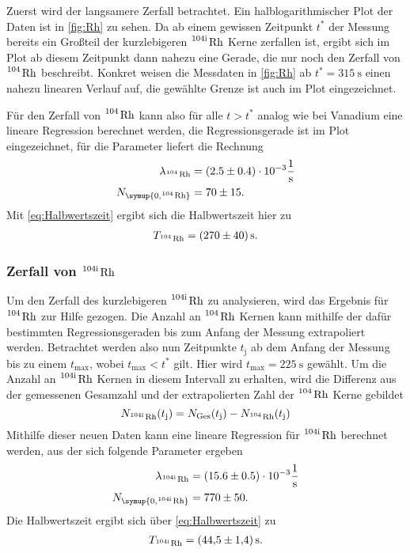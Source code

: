 Zuerst wird der langsamere Zerfall betrachtet. Ein halblogarithmischer Plot der Daten ist in \autoref{fig:Rh} zu sehen.
Da ab einem gewissen Zeitpunkt $t^*$ der Messung bereits ein
Großteil der kurzlebigeren $\ce{^{104\text{i}} Rh}$ Kerne zerfallen ist, ergibt sich im Plot ab diesem Zeitpunkt
dann nahezu eine Gerade, die nur noch den Zerfall von $\ce{^104 Rh}$ beschreibt.
Konkret weisen die Messdaten in \autoref{fig:Rh} ab $t^*=\qty{315}{\second}$ einen nahezu linearen Verlauf auf,
die gewählte Grenze ist auch im Plot eingezeichnet.

Für den Zerfall von $\ce{^104 Rh}$ kann also für alle $t>t^*$ analog wie bei Vanadium eine lineare Regression
berechnet werden, die Regressionsgerade ist im Plot eingezeichnet, für die Parameter liefert die Rechnung
\begin{align*}
  \lambda_{\ce{^104 Rh}} &= (2.5 \pm 0.4) \cdot 10^{-3} \unit{\per\second} \\
  N_{\symup{0, \ce{^104 Rh}}} &= 70 \pm 15.
\end{align*}
Mit \eqref{eq:Halbwertszeit} ergibt sich die Halbwertszeit hier zu
\begin{gather*}
  T_{\ce{^104 Rh}} = \qty{270+-40}{\second}.
\end{gather*}

\subsubsection{Zerfall von $\ce{^{104\text{i}} Rh}$}

Um den Zerfall des kurzlebigeren $\ce{^{104\text{i}} Rh}$ zu analysieren, wird das Ergebnis für $\ce{^104 Rh}$
zur Hilfe gezogen.
Die Anzahl an $\ce{^104 Rh}$ Kernen kann mithilfe der dafür bestimmten Regressionsgeraden bis zum Anfang
der Messung extrapoliert werden. Betrachtet werden also nun Zeitpunkte $t_{\text{j}}$ ab dem Anfang der
Messung bis zu einem $t_{\text{max}}$, wobei $t_{\text{max}}<t^*$ gilt.
Hier wird $t_{\text{max}}=\qty{225}{\second}$ gewählt.
Um die Anzahl an $\ce{^{104\text{i}} Rh}$ Kernen in diesem Intervall zu erhalten, wird die Differenz
aus der gemessenen Gesamzahl und der extrapolierten Zahl der $\ce{^104 Rh}$ Kerne gebildet
\begin{equation*}
  N_{\ce{^{104\text{i}} Rh}}(t_{\text{j}}) = N_{\text{Ges}}(t_{\text{j}}) - N_{\ce{^104 Rh}}(t_{\text{j}})
\end{equation*}
Mithilfe dieser neuen Daten kann eine lineare Regression für $\ce{^{104\text{i}} Rh}$ berechnet werden,
aus der sich folgende Parameter ergeben
\begin{align*}
  \lambda_{\ce{^{104\text{i}} Rh}} &= (15.6 \pm 0.5) \cdot 10^{-3} \unit{\per\second} \\
  N_{\symup{0, \ce{^{104\text{i}} Rh}}} &= 770 \pm 50.
\end{align*}
Die Halbwertszeit ergibt sich über \eqref{eq:Halbwertszeit} zu
\begin{gather*}
  T_{\ce{^{104\text{i}} Rh}} = \qty{44.5+-1.4}{\second}.
\end{gather*}

